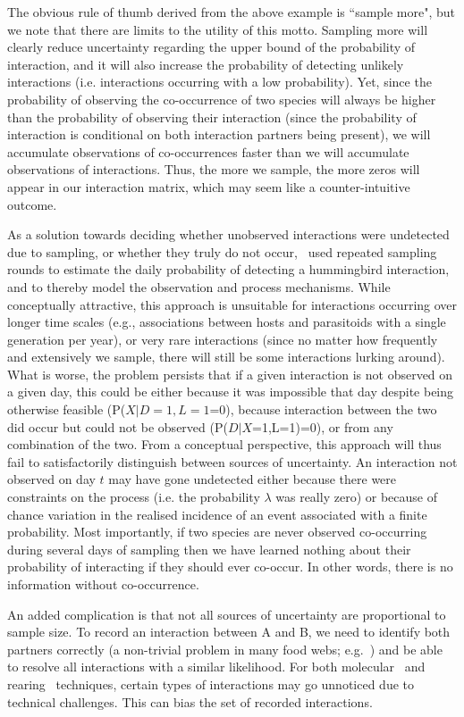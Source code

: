 \documentclass[12pt]{article}
\begin{document}
  The obvious rule of thumb derived from the above example is ``sample more", but we note that there are limits to the utility of this motto. Sampling more will clearly reduce uncertainty regarding the upper bound of the probability of interaction, and it will also increase the probability of detecting unlikely interactions (i.e. interactions occurring with a low probability). Yet, since the probability of observing the co-occurrence of two species will always be higher than the probability of observing their interaction (since the probability of interaction is conditional on both interaction partners being present), we will accumulate observations of co-occurrences faster than we will accumulate observations of interactions. Thus, the more we sample, the more zeros will appear in our interaction matrix, which may seem like a counter-intuitive outcome. 


  As a solution towards deciding whether unobserved interactions were undetected due to sampling, or whether they truly do not occur,~\citet{Weinstein2017} used repeated sampling rounds to estimate the daily probability of detecting a hummingbird interaction, and to thereby model the observation and process mechanisms. While conceptually attractive, this approach is unsuitable for interactions occurring over longer time scales (e.g., associations between hosts and parasitoids with a single generation per year), or very rare interactions (since no matter how frequently and extensively we sample, there will still be some interactions lurking around). What is worse, the problem persists that if a given interaction is not observed on a given day, this could be either because it was impossible that day despite being otherwise feasible (P($X|D=1,L=1$=0), because interaction between the two did occur but could not be observed (P($D|X$=1,L=1)=0), or from any combination of the two. From a conceptual perspective, this approach will thus fail to satisfactorily distinguish between sources of uncertainty. An interaction not observed on day $t$ may have gone undetected either because there were constraints on the process (i.e. the probability $\lambda$ was really zero) or because of chance variation in the realised incidence of an event associated with a finite probability. Most importantly, if two species are never observed co-occurring during several days of sampling then we have learned nothing about their probability of interacting if they should ever co-occur. In other words, there is no information without co-occurrence.


  An added complication is that not all sources of uncertainty are proportional to sample size. To record an interaction between A and B, we need to identify both partners correctly (a non-trivial problem in many food webs; e.g.~\citet{Kaartinen2011,Roslin2016}) and be able to resolve all interactions with a similar likelihood. For both molecular~\citep{} and rearing~\citep{} techniques, certain types of interactions may go unnoticed due to technical challenges. This can bias the set of recorded interactions.
\end{document}
